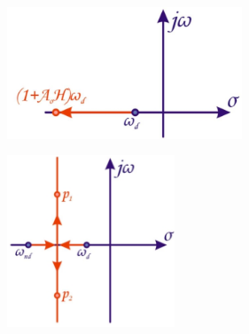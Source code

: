 \begin{minipage}{.5\textwidth}
	\centering
	\includegraphics[width=7cm]{figures/ch10/feedback9.jpg}
	\label{fig:feedback9}
\end{minipage}%
\begin{minipage}{.5\textwidth}
	\centering
	\includegraphics[width=5cm]{figures/ch10/feedback10.jpg}
	\label{fig:feedback10}
\end{minipage}

